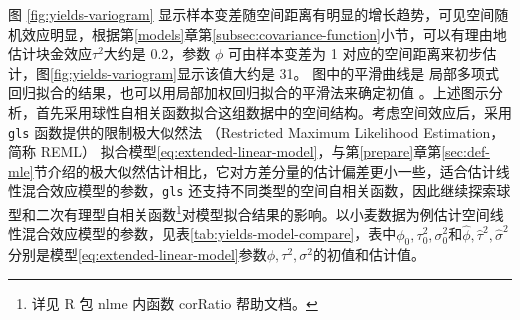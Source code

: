 \documentclass[12pt,a4paper,UTF8,twoside]{book}
\theoremstyle{definition}
\theoremstyle{definition}
\theoremstyle{definition}
\theoremstyle{remark}
\begin{document}
图 \ref{fig:yields-variogram} 显示样本变差随空间距离有明显的增长趋势，可见空间随机效应明显，根据第\ref{models}章第\ref{subsec:covariance-function}小节，可以有理由地估计块金效应\(\tau^2\)大约是 0.2，参数 \(\phi\) 可由样本变差为 1 对应的空间距离来初步估计，图\ref{fig:yields-variogram}显示该值大约是 31。 图中的平滑曲线是 局部多项式回归拟合的结果，也可以用局部加权回归拟合的平滑法来确定初值 \citep{Xie2008COS}。上述图示分析，首先采用球性自相关函数拟合这组数据中的空间结构。考虑空间效应后，采用 \texttt{gls} 函数提供的限制极大似然法 （Restricted Maximum Likelihood Estimation， 简称 REML） 拟合模型\eqref{eq:extended-linear-model}，与第\ref{prepare}章第\ref{sec:def-mle}节介绍的极大似然估计相比，它对方差分量的估计偏差更小一些\citep{Diggle2007}，适合估计线性混合效应模型的参数，\texttt{gls} 还支持不同类型的空间自相关函数，因此继续探索球型和二次有理型自相关函数\footnote{详见 R 包 nlme 内函数 corRatio 帮助文档。}对模型拟合结果的影响。以小麦数据为例估计空间线性混合效应模型的参数，见表\ref{tab:yields-model-compare}，表中\(\phi_0,\tau^2_{0},\sigma^2_{0}\)和\(\hat{\phi},\hat{\tau}^2,\hat{\sigma}^2\)分别是模型\eqref{eq:extended-linear-model}参数\(\phi,\tau^2,\sigma^2\)的初值和估计值。
\end{document}
